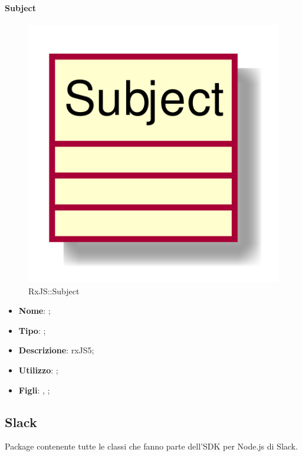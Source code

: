 \hypertarget{Subject_label}{\paragraph{Subject}}
\begin{figure}[h]
	\centering
	\includegraphics[width=\textwidth,height=\textheight,keepaspectratio]{images/ClassSubject.png}
	\caption{RxJS::Subject}
\end{figure}
\begin{itemize}
	\item \textbf{Nome}: ;
	\item \textbf{Tipo}: ;
	\item \textbf{Descrizione}: rxJS5;
	\item \textbf{Utilizzo}: ;
	\item \textbf{Figli}: , ;
\end{itemize}
\FloatBarrier

\subsection{Slack}
Package contenente tutte le classi che fanno parte dell'SDK per Node.js di Slack.

